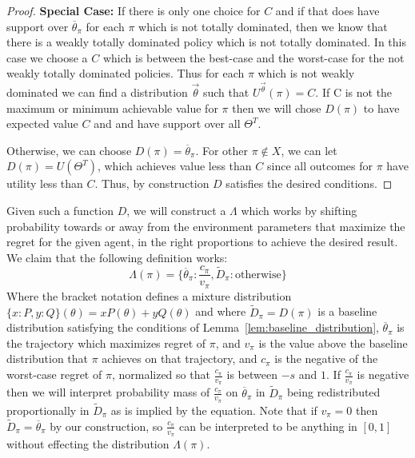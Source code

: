 \documentclass{article}
\begin{document}
\begin{appendix}
\begin{proof}
    \textbf{Special Case:} If there is only one choice for $C$ and if that does have support over $\overline{\theta}_{\pi}$ for each $\pi$ which is not totally dominated, then we know that there is a weakly totally dominated policy which is not totally dominated. In this case we choose a $C$ which is between the best-case and the worst-case for the not weakly totally dominated policies. Thus for each $\pi$ which is not weakly dominated we can find a distribution $\vec{\theta}$ such that $U^{\vec{\theta}}(\pi)=C$.  If C is not the maximum or minimum achievable value for $\pi$ then we will chose $D(\pi)$ to have expected value $C$ and and have support over all $\Theta^T$. 
    
    Otherwise, we can choose $D(\pi)=\overline{\theta}_{\pi}$.  For other $\pi \notin X$, we can let $D(\pi) = U(\Theta^T)$, which achieves value less than $C$ since all outcomes for $\pi$ have utility less than $C$.  Thus, by construction $D$ satisfies the desired conditions.
\end{proof}

Given such a function $D$, we will construct a $\Lambda$ which works by shifting probability towards or away from the environment parameters that maximize the regret for the given agent, in the right proportions to achieve the desired result.  We claim that the following definition works:
\[
\Lambda(\pi) = \{\overline{\theta}_{\pi}: \frac{c_\pi}{v_\pi}, \tilde{D}_{\pi}:\text{otherwise} \}
\]
Where the bracket notation defines a mixture distribution $\{x:P, y:Q\}(\theta) = x P(\theta)+y Q(\theta)$ and where $\tilde{D}_{\pi}=D(\pi)$ is a baseline distribution satisfying the conditions of Lemma~\ref{lem:baseline_distribution}, $\overline{\theta}_{\pi}$ is the trajectory which maximizes regret of $\pi$, and $v_\pi$ is the value above the baseline distribution that $\pi$ achieves on that trajectory, and $c_\pi$ is the negative of the worst-case regret of $\pi$, normalized so that $\frac{c_\pi}{v_\pi}$ is between $-s$ and $1$.  If $\frac{c_\pi}{v_\pi}$ is negative then we will interpret probability mass of $\frac{c_\pi}{v_\pi}$ on $\overline{\theta}_{\pi}$ in $\tilde{D}_{\pi}$ being redistributed proportionally in $\tilde{D}_{\pi}$ as is implied by the equation.  Note that if $v_\pi=0$ then $\tilde{D}_{\pi} =\overline{\theta}_{\pi} $ by our construction, so $\frac{c_\pi}{v_\pi}$ can be interpreted to be anything in $[0,1]$ without effecting the distribution $\Lambda(\pi)$.


\end{appendix}
\end{document}

